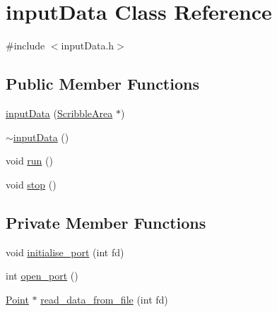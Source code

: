\hypertarget{classinputData}{
\section{inputData Class Reference}
\label{classinputData}
}


{\ttfamily \#include $<$inputData.h$>$}\subsection*{Public Member Functions}
\begin{DoxyCompactItemize}
\item 
\hyperlink{classinputData_a51ae7522e18bc9301e5f0c858cc8937f}{inputData} (\hyperlink{classScribbleArea}{ScribbleArea} $\ast$)
\item 
\hyperlink{classinputData_a274ac89032afd6577250e13efad58e8a}{$\sim$inputData} ()
\item 
void \hyperlink{classinputData_a33da87cf60295dc3c661c2273d4336a1}{run} ()
\item 
void \hyperlink{classinputData_a438c97b6d6ccc1abe4c8adceff0decb4}{stop} ()
\end{DoxyCompactItemize}
\subsection*{Private Member Functions}
\begin{DoxyCompactItemize}
\item 
void \hyperlink{classinputData_a34d2155db86b23204da21a3af5ef1211}{initialise\_\-port} (int fd)
\item 
int \hyperlink{classinputData_ad3a85999bb1abee177ac0f15db28edcf}{open\_\-port} ()
\item 
\hyperlink{classPoint}{Point} $\ast$ \hyperlink{classinputData_a2d5c86a45945b8a0f93ce0a44bde4d93}{read\_\-data\_\-from\_\-file} (int fd)
\end{DoxyCompactItemize}
